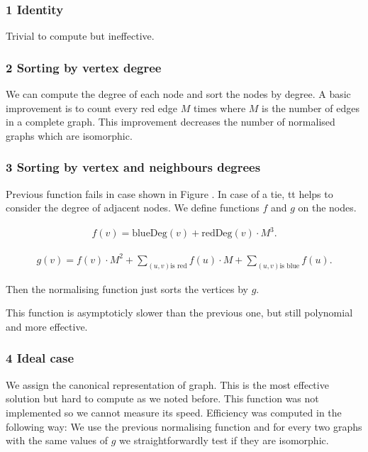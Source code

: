 \subsubsection{1 Identity}
Trivial to compute but ineffective.

\subsubsection{2 Sorting by vertex degree} \label{norm1}

We can compute the degree of each node and sort the nodes by degree. A basic improvement
is to count every red edge $M$ times where $M$ is the number of edges in a complete
graph. This improvement decreases the number of normalised graphs which are isomorphic.

\subsubsection{3 Sorting by vertex and neighbours degrees} \label{norm2}

Previous function fails in case shown in Figure . In case of a tie, tt helps to
consider the degree of adjacent nodes. We define functions $f$ and $g$ on the  nodes.

\begin{eqnarray*} 
f(v) = \mbox{blueDeg}(v) + \mbox{redDeg}(v) \cdot M^3.
\end{eqnarray*}

\begin{eqnarray*} 
g(v) = f(v) \cdot M^2 + \sum_{(u,v) \mbox{is red}}{f(u) \cdot M} + \sum_{(u,v) \mbox{is blue}}{f(u)}.
\end{eqnarray*}

Then the normalising function just sorts the vertices by $g$.

This function is asymptoticly slower than the previous one, but still polynomial
and more effective.

\subsubsection{4 Ideal case} 
We assign the canonical representation of graph.
This is the most effective solution but hard to compute as we noted before.
This function was not implemented so we cannot measure its speed.
Efficiency was computed in the following way: We use the previous normalising function
and for every two graphs with the same values of $g$ we straightforwardly test 
if they are isomorphic. 

